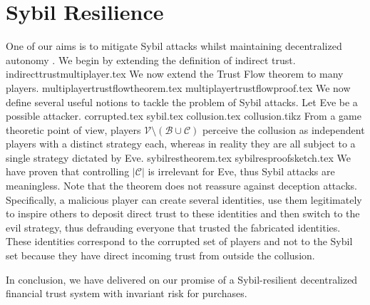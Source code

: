\section{Sybil Resilience}
  One of our aims is to mitigate Sybil attacks \cite{sybilattack} whilst maintaining decentralized autonomy \cite{dionyziz}.
  We begin by extending the definition of indirect trust.
  {indirecttrustmultiplayer.tex}
  \noindent We now extend the Trust Flow theorem to many players.
  {multiplayertrustflowtheorem.tex}
  {multiplayertrustflowproof.tex}
  \noindent We now define several useful notions to tackle the problem of Sybil attacks. Let Eve be a possible attacker.
  {corrupted.tex}
  {sybil.tex}
  {collusion.tex}
  {collusion.tikz}
  From a game theoretic point of view, players $\mathcal{V} \setminus (\mathcal{B} \cup \mathcal{C})$ perceive the collusion
  as independent players with a distinct strategy each, whereas in reality they are all subject to a single strategy dictated
  by Eve.
  {sybilrestheorem.tex}
  {sybilresproofsketch.tex}
  We have proven that controlling $|\mathcal{C}|$ is irrelevant for Eve, thus Sybil attacks are meaningless. Note that
  the theorem does not reassure against deception attacks. Specifically, a malicious player can create several identities, use
  them legitimately to inspire others to deposit direct trust to these identities and then switch to the evil strategy, thus
  defrauding everyone that trusted the fabricated identities. These identities correspond to the corrupted set of players and
  not to the Sybil set because they have direct incoming trust from outside the collusion.

  In conclusion, we have delivered on our promise of a Sybil-resilient decentralized financial trust system with invariant
  risk for purchases.

